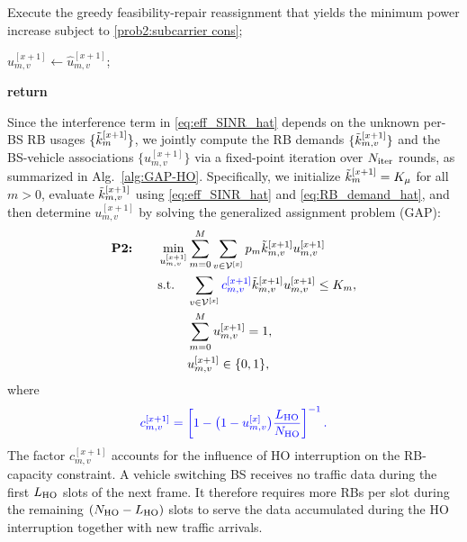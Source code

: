 \documentclass[10pt,journal,letterpaper]{journal_template/IEEEtran}
\newcommand{\rev}[1]{\textcolor{revisioncolor}{{}#1}}
\theoremstyle{remark}
\begin{document}
\begin{algorithm}[htbp]
\begin{algorithmic}[1]
        
            \STATE Execute the greedy feasibility-repair reassignment that yields the minimum power increase\rev{ subject to \eqref{prob2:subcarrier cons}};
        \ENDWHILE

        \STATE $u_{m,v}^{[x+1]} \leftarrow \hat{u}_{m,v}^{[x+1]}$;

        \STATE \textbf{return}
    \end{algorithmic}
\end{algorithm}


Since the interference term in \eqref{eq:eff_SINR_hat} depends on the unknown per-BS RB usages $\{\Tilde{k}_{m}^{[x+1]}\}$, we jointly compute the RB demands $\{\Tilde{k}_{m,v}^{[x+1]}\}$ and the BS-vehicle associations $\{u_{m,v}^{[x+1]}\}$ via a fixed-point iteration \rev{over $N_{\rm iter}$ rounds}, as summarized in Alg.~\ref{alg:GAP-HO}. Specifically, we initialize $\Tilde{k}_{m}^{[x+1]}=K_\mu$ for all $m>0$, evaluate $\Tilde{k}_{m,v}^{[x+1]}$ using \eqref{eq:eff_SINR_hat} and \eqref{eq:RB_demand_hat}, and then determine $u_{m,v}^{[x+1]}$ by solving the generalized assignment problem (GAP):
\begin{align}
    \label{prob2}
    \textbf{P2:} \qquad  \min_{u_{m,v}^{[x+1]}} & \sum_{m=0}^M \sum_{v\in\mathcal{V}^{[x]}} p_m  \Tilde{k}_{m,v}^{[x+1]} u_{m,v}^{[x+1]} \\
    \textup{s.t.} \quad 
    & \sum_{v \in \mathcal{V}^{[x]}} \rev{c_{m,v}^{[x+1]}}\Tilde{k}_{m,v}^{[x+1]} u_{m,v}^{[x+1]} \leq K_m,
    \label{prob2:subcarrier cons}\\
    & \sum_{m=0}^{M} u_{m,v}^{[x+1]} = 1,
    \label{prob2:connection cons} \\
    & u_{m,v}^{[x+1]} \in \{0,1\},
    \label{prob2:u cons} 
\end{align}
where
\begin{equation}
    \rev{c_{m,v}^{[x+1]}=
    \left[1-\bigl(1-u_{m,v}^{[x]}\bigr)
    \frac{L_{\rm HO}}{N_{\rm HO}}\right]^{-1}.}
    \label{eq:HO_capacity_factor}
\end{equation}
\rev{The factor $c_{m,v}^{[x+1]}$ accounts for the influence of HO interruption on the RB-capacity constraint. A vehicle switching BS receives no traffic data during the first $L_{\rm HO}$ slots of the next frame. It therefore requires more RBs per slot during the remaining $(N_{\rm HO}-L_{\rm HO})$ slots to serve the data accumulated during the HO interruption together with new traffic arrivals.}
\end{document}
